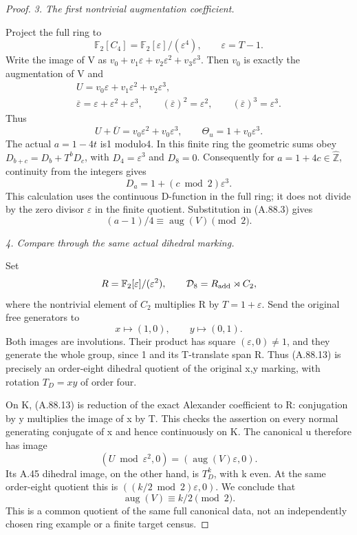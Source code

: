 \begin{proof}
\emph{3. The first nontrivial augmentation coefficient.}\par
Project the full ring to
\[
                \mathbb F_2[C_4]=\mathbb F_2[\varepsilon]/(\varepsilon^4),
                \qquad\varepsilon=T-1.
\]
Write the image of V as
\(v_0+v_1\varepsilon+v_2\varepsilon^2+v_3\varepsilon^3\).
Then \(v_0\) is exactly the augmentation of V and
\[
 \begin{gathered}
 U=v_0\varepsilon+v_1\varepsilon^2+v_2\varepsilon^3,\\
 \overline\varepsilon=\varepsilon+\varepsilon^2+\varepsilon^3,
 \qquad (\overline{\varepsilon})^2=\varepsilon^2,
 \qquad (\overline{\varepsilon})^3=\varepsilon^3.
 \end{gathered}
\]
Thus
\[
                 U+\overline U=v_0\varepsilon^2+v_0\varepsilon^3,
                 \qquad\Theta_u=1+v_0\varepsilon^3.
 \tag{A.88.10}
\]
The actual \(a=1-4t\) is1 modulo4. In this finite ring the
geometric sums obey
\(D_{b+c}=D_b+T^bD_c\), with
\(D_4=\varepsilon^3\) and \(D_8=0\). Consequently for
\(a=1+4c\in\widehat{\mathbb Z}\), continuity from the integers gives
\[
                     D_a=1+(c\bmod2)\varepsilon^3.
 \tag{A.88.11}
\]
This calculation uses the continuous D-function in the full ring;
it does not divide by the zero divisor \(\varepsilon\) in the
finite quotient. Substitution in (A.88.3) gives
\[
                         (a-1)/4\equiv\operatorname{aug}(V)\pmod2.
 \tag{A.88.12}
\]

\emph{4. Compare through the same actual dihedral marking.}\par
Set
\[
 R=\mathbb F_2[\varepsilon]/(\varepsilon^2),\qquad
 \mathcal D_8=R_{\rm add}\rtimes C_2,
\]
where the nontrivial element of \(C_2\) multiplies R by
\(T=1+\varepsilon\). Send the original free generators to
\[
                          x\longmapsto(1,0),\qquad
                          y\longmapsto(0,1).
 \tag{A.88.13}
\]
Both images are involutions. Their product has square
\((\varepsilon,0)\ne1\), and they generate the whole group, since
1 and its T-translate span R. Thus (A.88.13) is precisely an
order-eight dihedral quotient of the original x,y marking, with
rotation \(T_D=xy\) of order four.

On K, (A.88.13) is reduction of the exact Alexander coefficient
to R: conjugation by y multiplies the image of x by T. This checks
the assertion on every normal generating conjugate of x and hence
continuously on K. The canonical u therefore has image
\[
                  (U\bmod\varepsilon^2,0)
                    =(\operatorname{aug}(V)\varepsilon,0).
\]
Its A.45 dihedral image, on the other hand, is \(T_D^k\), with k
even. At the same order-eight quotient this is
\(((k/2\bmod2)\varepsilon,0)\). We conclude that
\[
                         \operatorname{aug}(V)\equiv k/2\pmod2.
 \tag{A.88.14}
\]
This is a common quotient of the same full canonical data, not
an independently chosen ring example or a finite target census.


\end{proof}
